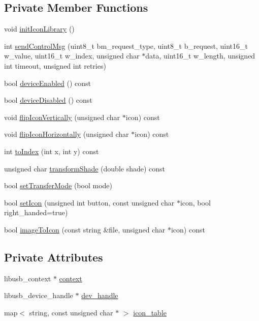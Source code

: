 \subsection*{Private Member Functions}
\begin{DoxyCompactItemize}
\item 
void \hyperlink{classWacomIntuos4LED_ab6fd1d732fb117cdeac89ecce1e452c7}{initIconLibrary} ()
\item 
int \hyperlink{classWacomIntuos4LED_aa963de95c325d024f52299e15239d637}{sendControlMsg} (uint8\_\-t bm\_\-request\_\-type, uint8\_\-t b\_\-request, uint16\_\-t w\_\-value, uint16\_\-t w\_\-index, unsigned char $\ast$data, uint16\_\-t w\_\-length, unsigned int timeout, unsigned int retries)
\item 
bool \hyperlink{classWacomIntuos4LED_a92b68094ddf6fb17d02a94707ee4bca3}{deviceEnabled} () const 
\item 
bool \hyperlink{classWacomIntuos4LED_ae75b2a53c3c54db95617d068eac9688c}{deviceDisabled} () const 
\item 
void \hyperlink{classWacomIntuos4LED_a7caf2972f79759408ce7d8d2667fdcd1}{flipIconVertically} (unsigned char $\ast$icon) const 
\item 
void \hyperlink{classWacomIntuos4LED_adcb43a6ddd0a19557cf99ddbf08aff44}{flipIconHorizontally} (unsigned char $\ast$icon) const 
\item 
int \hyperlink{classWacomIntuos4LED_a7c5fc8f9c08c88d61633786a04a1047e}{toIndex} (int x, int y) const 
\item 
unsigned char \hyperlink{classWacomIntuos4LED_a3113d983c8f690f7f2db4dbf5f0d7355}{transformShade} (double shade) const 
\item 
bool \hyperlink{classWacomIntuos4LED_a63439e43d482362627c9028e544ed545}{setTransferMode} (bool mode)
\item 
bool \hyperlink{classWacomIntuos4LED_a1bbf66f9d21ee52a107b2ba7e0cb5cef}{setIcon} (unsigned int button, const unsigned char $\ast$icon, bool right\_\-handed=true)
\item 
bool \hyperlink{classWacomIntuos4LED_a6e09813294c5932179d083f8cd9993f8}{imageToIcon} (const string \&file, unsigned char $\ast$icon) const 
\end{DoxyCompactItemize}
\subsection*{Private Attributes}
\begin{DoxyCompactItemize}
\item 
libusb\_\-context $\ast$ \hyperlink{classWacomIntuos4LED_a20d7e60936642f82fc06ab227c34ee9b}{context}
\item 
libusb\_\-device\_\-handle $\ast$ \hyperlink{classWacomIntuos4LED_a8afbdadc8bb470ca82ac4c117f431177}{dev\_\-handle}
\item 
map$<$ string, const unsigned char $\ast$ $>$ \hyperlink{classWacomIntuos4LED_afaf5e54e94691f75468a57596f871ff2}{icon\_\-table}
\end{DoxyCompactItemize}


